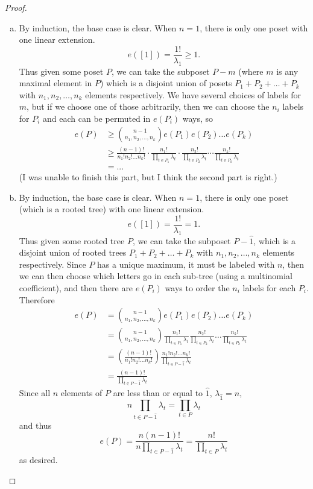 \documentclass{article}
\begin{document}
\begin{proof}
  \begin{enumerate}[a.]
    \item By induction, the base case is clear. When $n=1$, there is only
    one poset with one linear extension. \[
      e([1]) = \frac{1!}{\lambda_{1}} \geq 1.
    \]
    Thus given some poset $P$, we can take the subposet $P - m$ (where $m$ is
    any maximal element in $P$) which is a disjoint union of posets
    $P_1 + P_2 + \hdots + P_k$ with $n_1, n_2, \hdots, n_k$ elements respectively.
    We have several choices of labels for $m$, but if we choose one of those
    arbitrarily, then we can choose the $n_i$ labels for $P_i$ and each can be
    permuted in $e(P_i)$ ways, so \begin{align*}
      e(P) &\geq \binom{n - 1}{n_1, n_2, \hdots, n_k}e(P_1)e(P_2)\hdots e(P_k) \\
      &\geq \frac{(n - 1)!}{n_1! n_2! \hdots n_k!} \cdot
      \frac{n_1!}{\prod_{t \in P_1} \lambda_t}\cdot
      \frac{n_2!}{\prod_{t \in P_2} \lambda_t}
      \cdots
      \frac{n_k!}{\prod_{t \in P_k} \lambda_t} \\
      &= ...
    \end{align*}
    (I was unable to finish this part, but I think the second part is right.)
    \item By induction, the base case is clear. When $n=1$, there is only
    one poset (which is a rooted tree) with one linear extension. \[
      e([1]) = \frac{1!}{\lambda_{1}} = 1.
    \]
    Thus given some rooted tree $P$, we can take the subposet $P - \hat 1$, which
    is a disjoint union of rooted trees
    $P_1 + P_2 + \hdots + P_k$ with $n_1, n_2, \hdots, n_k$ elements respectively.
    Since $P$ has a unique maximum, it must be labeled with $n$, then we can
    then choose which letters go in each sub-tree (using a multinomial
    coefficient), and then there are $e(P_i)$ ways to order the $n_i$ labels
    for each $P_i$. Therefore \begin{align*}
        e(P) &= \binom{n - 1}{n_1, n_2, \hdots, n_k}e(P_1)e(P_2)\hdots e(P_k)
        \\
        &= \binom{n - 1}{n_1, n_2, \hdots, n_k}
        \frac{n_1!}{\prod_{t \in P_1} \lambda_t}
        \frac{n_2!}{\prod_{t \in P_2} \lambda_t}
        \hdots
        \frac{n_k!}{\prod_{t \in P_k} \lambda_t}
        \\
        &= \left(\frac{(n - 1)!}{n_1! n_2! \hdots n_k!}\right)
        \frac{n_1!n_2!\hdots n_k!}{\prod_{t \in P - \hat 1} \lambda_t}
        \\
        &= \frac{(n-1)!}{\prod_{t \in P - \hat 1} \lambda_t}
    \end{align*}
    Since all $n$ elements of $P$ are less than or equal to $\hat 1$,
    $\lambda_{\hat 1} = n$, \[
      n\prod_{t \in P - \hat 1} \lambda_t = \prod_{t \in P} \lambda_t
    \] and thus \[
      e(P) = \frac{n(n-1)!}{n\prod_{t \in P - \hat 1} \lambda_t} = \frac{n!}{\prod_{t \in P} \lambda_t}
    \] as desired.
  \end{enumerate}
\end{proof}
\end{document}

